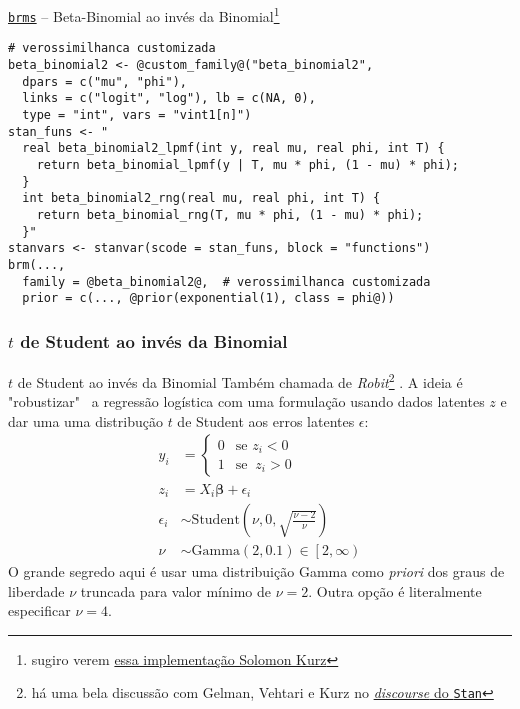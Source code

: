 \begin{frame}[fragile]{\href{https://paul-buerkner.github.io/brms/}{\texttt{brms}} -- Beta-Binomial ao invés da Binomial\footnote{sugiro verem \href{https://bookdown.org/content/4857/monsters-and-mixtures.html}{essa implementação Solomon Kurz}}}
	\begin{lstlisting}[basicstyle=\footnotesize]
# verossimilhanca customizada
beta_binomial2 <- @custom_family@("beta_binomial2",
  dpars = c("mu", "phi"),
  links = c("logit", "log"), lb = c(NA, 0),
  type = "int", vars = "vint1[n]")
stan_funs <- "
  real beta_binomial2_lpmf(int y, real mu, real phi, int T) {
    return beta_binomial_lpmf(y | T, mu * phi, (1 - mu) * phi);
  }
  int beta_binomial2_rng(real mu, real phi, int T) {
    return beta_binomial_rng(T, mu * phi, (1 - mu) * phi);
  }"
stanvars <- stanvar(scode = stan_funs, block = "functions")
brm(...,
  family = @beta_binomial2@,  # verossimilhanca customizada
  prior = c(..., @prior(exponential(1), class = phi@))
    \end{lstlisting}
\end{frame}

\subsubsection{$t$ de Student ao invés da Binomial}
\begin{frame}{$t$ de Student ao invés da Binomial}
	\small
	Também chamada de \textit{Robit}\footnote{há uma bela discussão com Gelman,
		Vehtari e Kurz no
		\href{https://discourse.mc-stan.org/t/robit-regression-not-robust/21245/}{
			\textit{discourse} do \texttt{Stan}}} \parencite{gelman2013bayesian, gelman2020regression}.
	A ideia é "robustizar"~ a regressão logística com uma formulação usando dados
	latentes $z$ e dar uma uma distribução $t$ de Student aos erros latentes $\epsilon$:
	$$
		\begin{aligned}
			y_i        & = \begin{cases} 0 & \text{se } z_i < 0 \\ 1 & \text{se }\ z_i > 0 \end{cases} \\
			z_i        & = X_i \boldsymbol{\beta} + \epsilon_i                                         \\
			\epsilon_i & \sim \text{Student} \left (\nu, 0, \sqrt{\frac{\nu - 2}{\nu}} \right)         \\
			\nu        & \sim \text{Gamma}(2, 0.1) \in \left[2, \infty \right)
		\end{aligned}
	$$
	\footnotesize
	O grande segredo aqui é usar uma distribuição Gamma como \textit{priori}
	dos graus de liberdade $\nu$ truncada para valor mínimo de $\nu = 2$. Outra opção
	é literalmente especificar $\nu=4$.
\end{frame}


